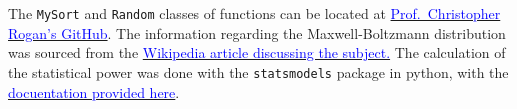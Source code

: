 \documentclass[%
 reprint,
 amsmath,amssymb,
 aps,
]{revtex4-2}
\begin{document}
The \lstinline{MySort} and \lstinline{Random} classes of functions can be located at \href{https://github.com/crogan/PHSX815_Week2}{\textcolor{blue}{Prof.\ Christopher Rogan's GitHub}}. The information regarding the Maxwell-Boltzmann distribution was sourced from the \href{https://en.wikipedia.org/wiki/Maxwell%E2%80%93Boltzmann_distribution}{\textcolor{blue}{Wikipedia article discussing the subject.}} The calculation of the statistical power was done with the \lstinline{statsmodels} package in python, with the \href{https://www.statsmodels.org/dev/generated/statsmodels.stats.power.tt_ind_solve_power.html}{\textcolor{blue}{docuentation provided here}}. 

\nocite{*}

\end{document}
